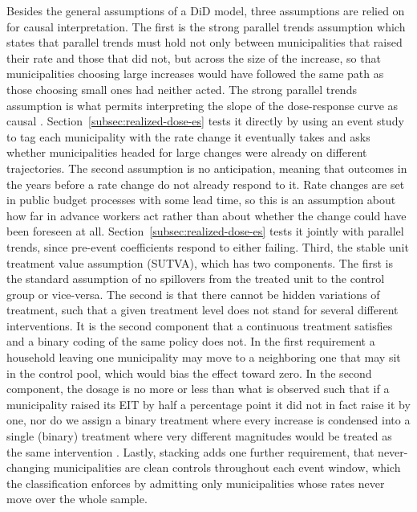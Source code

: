 \documentclass[12pt]{article}
\begin{document}
Besides the general assumptions of a DiD model, three assumptions are relied on for causal interpretation. The first is the strong parallel trends assumption which states that parallel trends must hold not
only between municipalities that raised their rate and those that did
not, but across the size of the increase, so that municipalities choosing
large increases would have followed the same path as those choosing small
ones had neither acted. The strong parallel trends assumption is what permits interpreting the slope of the dose-response curve as
causal \citep{callawayDifferenceindifferencesContinuousTreatment2024}.
Section~\ref{subsec:realized-dose-es} tests it directly by using an event study to tag each
municipality with the rate change it eventually takes and asks whether
municipalities headed for large changes were already on different
trajectories. The second assumption is no anticipation, meaning that outcomes in the years
before a rate change do not already respond to it. Rate changes are set
in public budget processes with some lead time, so this is an assumption
about how far in advance workers act rather than about whether the
change could have been foreseen at all. Section~\ref{subsec:realized-dose-es}
tests it jointly with parallel trends, since pre-event coefficients
respond to either failing. Third, the stable unit treatment value
assumption (SUTVA), which has two components. The first is the standard assumption of no spillovers from the treated unit to the control group or vice-versa. The second is that there cannot be hidden variations of treatment, such that a given treatment level does not stand for several different interventions. It is the second component that a continuous treatment satisfies and a binary coding of the same policy does not. In the first requirement a household leaving one municipality may move to a
neighboring one that may sit in the control pool, which would bias the effect toward zero. In the second component, the dosage is no more or less than what is observed such that if a municipality raised its EIT by half a percentage point it did not in fact raise it by one, nor do we assign a binary treatment where
every increase is condensed into a single (binary) treatment where very different
magnitudes would be treated as the same intervention \citep{imbensCausalInferenceStatistics2015}. Lastly, stacking adds one
further requirement, that never-changing municipalities are clean
controls throughout each event window, which the classification enforces
by admitting only municipalities whose rates never move over the whole
sample.
\end{document}

